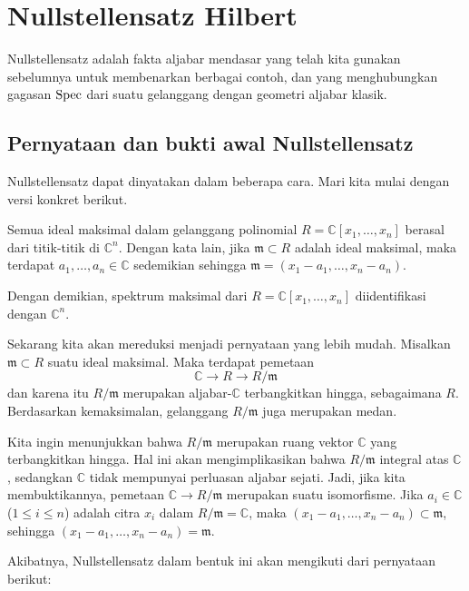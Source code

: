 \section{Nullstellensatz Hilbert}

Nullstellensatz adalah fakta aljabar mendasar yang telah kita gunakan sebelumnya
untuk membenarkan berbagai contoh, dan yang menghubungkan gagasan
$\operatorname{Spec}$ dari suatu gelanggang dengan geometri aljabar klasik.

\subsection{Pernyataan dan bukti awal Nullstellensatz}

Nullstellensatz dapat dinyatakan dalam beberapa cara. Mari kita
mulai dengan versi konkret berikut.

\begin{theorem} \label{nullstellensatzoverC}
Semua ideal maksimal dalam gelanggang polinomial $R=\mathbb{C}[x_1, \dots, x_n]$ berasal
dari titik-titik di $\mathbb{C}^n$. Dengan kata lain, jika $\mathfrak{m} \subset R$ adalah
ideal maksimal, maka terdapat $a_1, \dots, a_n \in \mathbb{C}$ sedemikian sehingga
$\mathfrak{m} = (x_1 - a_1, \dots, x_n - a_n)$.
\end{theorem}


Dengan demikian, spektrum maksimal dari $R=\mathbb{C}[x_1, \dots, x_n]$ diidentifikasi dengan
$\mathbb{C}^n$.

Sekarang kita akan mereduksi  menjadi pernyataan yang lebih mudah.
Misalkan
$\mathfrak{m}\subset R$ suatu ideal maksimal. Maka terdapat pemetaan
\[ \mathbb{C} \to R \to R/\mathfrak{m}  \]
dan karena itu $R/\mathfrak{m}$ merupakan aljabar-$\mathbb{C}$ terbangkitkan hingga, sebagaimana
$R$. Berdasarkan kemaksimalan, gelanggang $R/\mathfrak{m}$ juga merupakan medan.

Kita ingin menunjukkan bahwa $R/\mathfrak{m}$ merupakan ruang vektor
$\mathbb{C}$ yang terbangkitkan
hingga. Hal ini akan mengimplikasikan bahwa $R/\mathfrak{m}$ integral atas $\mathbb{C}$,
sedangkan $\mathbb{C}$ tidak mempunyai perluasan aljabar sejati. Jadi, jika kita
membuktikannya, pemetaan $\mathbb{C} \to R/\mathfrak{m}$ merupakan suatu
isomorfisme. Jika $a_i \in \mathbb{C}$ ($1 \leq i \leq n$) adalah citra
$x_i $ dalam $R/\mathfrak{m} =
\mathbb{C}$, maka $(x_1 - a_1, \dots, x_n - a_n) \subset
\mathfrak{m}$, sehingga $(x_1 - a_1, \dots, x_n - a_n)=
\mathfrak{m}$.


Akibatnya, Nullstellensatz dalam bentuk ini akan mengikuti dari
pernyataan berikut:

